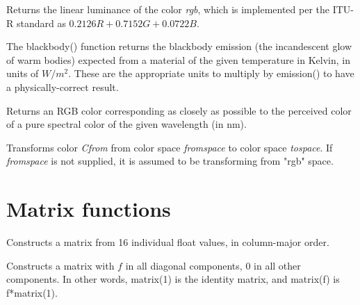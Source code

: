 \documentclass[11pt,letterpaper]{book}
\def\float{{\cf float}\xspace}
\def\matrix{{\cf matrix}\xspace}
\def\rgbspace{{\cf "rgb"} space\xspace}
\begin{document}
Returns the linear luminance of the color \emph{rgb}, which is
implemented per the ITU-R standard as $0.2126 R + 0.7152 G + 0.0722 B$.
\apiend


The {\cf blackbody()} function returns the blackbody emission (the
incandescent glow of warm bodies) expected from a material of the given
temperature in Kelvin, in units of $W/m^2$.  These are the appropriate
units to multiply by {\cf emission()} to have a physically-correct
result.
\apiend

Returns an RGB color corresponding as closely as possible to the
perceived color of a pure spectral color of the given wavelength (in nm).
\apiend

Transforms color \emph{Cfrom} from color space \emph{fromspace} to
color space \emph{tospace}.  If \emph{fromspace} is not supplied,
it is assumed to be transforming from \rgbspace.

\apiend


\section{Matrix functions}
\label{sec:stdlib:matrix}

Constructs a \matrix from 16 individual \float values, in column-major
order.  
\apiend

Constructs a \matrix with $f$ in all diagonal components, 0 in all other
components.  In other words, {\cf matrix(1)} is the identity matrix, and
{\cf matrix(f)} is {\cf f*matrix(1)}.
\apiend
\end{document}
